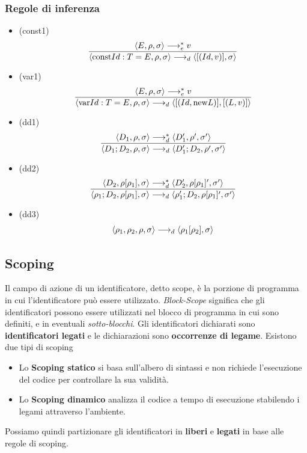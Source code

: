\documentclass{article}
\begin{document}
\subsubsection*{Regole di inferenza}
\begin{itemize}
  \item (const1)
        \[\frac
          {\langle E,\rho,\sigma \rangle \longrightarrow^*_e v}
          {\langle \text{const} Id: T = E,\rho,\sigma \rangle \longrightarrow_d \langle [(Id,v)],\sigma \rangle}\]

  \item (var1)
        \[\frac
          {\langle E,\rho,\sigma \rangle \longrightarrow^*_e v}
          {\langle \text{var} Id: T = E,\rho,\sigma \rangle \longrightarrow_d \langle [(Id,\text{new} L)],[(L,v)] \rangle}\]

  \item (dd1)
        \[\frac
          {\langle D_1,\rho,\sigma \rangle \longrightarrow^*_d \langle D_1',\rho',\sigma' \rangle}
          {\langle D_1;D_2,\rho,\sigma \rangle \longrightarrow_d \langle D_1';D_2,\rho',\sigma' \rangle}\]

  \item (dd2)
        \[\frac
          {\langle D_2,\rho[\rho_1],\sigma \rangle \longrightarrow^*_d \langle D_2',\rho[\rho_1]',\sigma' \rangle}
          {\langle \rho_1;D_2,\rho[\rho_1],\sigma \rangle \longrightarrow_d \langle \rho_1';D_2,\rho[\rho_1]',\sigma' \rangle}\]

  \item (dd3)
        \[\langle \rho_1,\rho_2,\rho,\sigma \rangle \longrightarrow_d \langle \rho_1[\rho_2], \sigma \rangle\]
\end{itemize}
\pagebreak

\subsection{Scoping}
Il campo di azione di un identificatore, detto scope, è la porzione di programma in cui l'identificatore può essere utilizzato. \emph{Block-Scope} significa che gli identificatori possono essere utilizzati nel blocco di programma in cui sono definiti, e in eventuali \emph{sotto-blocchi}.
Gli identificatori dichiarati sono \textbf{identificatori legati} e le dichiarazioni sono \textbf{occorrenze di legame}. Esistono due tipi di scoping
\begin{itemize}
  \item Lo \textbf{Scoping statico} si basa sull'albero di sintassi e non richiede l'esecuzione del codice per controllare la sua validità.
  \item Lo \textbf{Scoping dinamico} analizza il codice a tempo di esecuzione stabilendo i legami attraverso l'ambiente.
\end{itemize}
Possiamo quindi partizionare gli identificatori in \textbf{liberi} e \textbf{legati} in base alle regole di scoping.
\pagebreak
\end{document}
